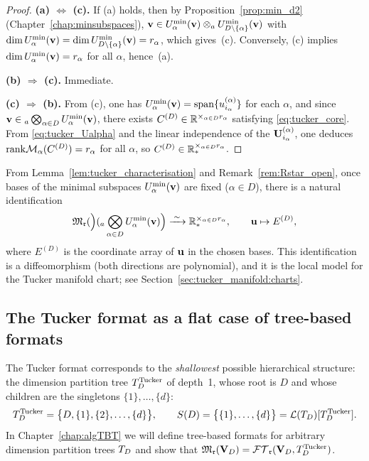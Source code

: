 \begin{proof}
\textbf{(a) $\Leftrightarrow$ (c).} If (a) holds, then by
Proposition~\ref{prop:min_d2} (Chapter~\ref{chap:minsubspaces}),
$\mathbf{v} \in U^{\min}_{\alpha}(\mathbf{v}) \otimes_a U^{\min}_{D\setminus\{\alpha\}}(\mathbf{v})$
with $\dim U^{\min}_{\alpha}(\mathbf{v}) = \dim U^{\min}_{D\setminus\{\alpha\}}(\mathbf{v}) = r_\alpha$,
which gives~(c). Conversely, (c) implies $\dim U^{\min}_{\alpha}(\mathbf{v}) = r_\alpha$
for all $\alpha$, hence~(a).

\textbf{(b) $\Rightarrow$ (c).} Immediate.

\textbf{(c) $\Rightarrow$ (b).} From (c), one has
$U^{\min}_{\alpha}(\mathbf{v}) = \mathrm{span}\{u^{(\alpha)}_{i_\alpha}\}$ for each $\alpha$,
and since $\mathbf{v} \in {}_a\bigotimes_{\alpha \in D} U^{\min}_{\alpha}(\mathbf{v})$,
there exists $C^{(D)} \in \mathbb{R}^{\times_{\alpha \in D} r_\alpha}$ satisfying
\eqref{eq:tucker_core}. From \eqref{eq:tucker_Ualpha} and the linear
independence of the $\mathbf{U}^{(\alpha)}_{i_\alpha}$, one deduces
$\mathrm{rank} \mathcal{M}_{\alpha}(C^{(D)}) = r_\alpha$ for all $\alpha$, so
$C^{(D)} \in \mathbb{R}^{\times_{\alpha \in D} r_\alpha}_*$.
\end{proof}

\begin{remark}
\label{rem:tucker_identification}
From Lemma~\ref{lem:tucker_characterisation} and
Remark~\ref{rem:Rstar_open}, once bases of the minimal subspaces
$U^{\min}_{\alpha}(\mathbf{v})$ are fixed ($\alpha \in D$), there is a natural
identification
\begin{equation}
\label{eq:tucker_iso}
    \mathfrak{M}_{\mathfrak{r}}(\Bigl)({}_a\bigotimes_{\alpha \in D} U^{\min}_{\alpha}(\mathbf{v})\Bigr)
    \xrightarrow{\;\sim\;}
    \mathbb{R}^{\times_{\alpha \in D} r_\alpha}_*,
    \qquad
    \mathbf{u} \mapsto E^{(D)},
\end{equation}
where $E^{(D)}$ is the coordinate array of $\mathbf{u}$ in the chosen bases.
This identification is a diffeomorphism (both directions are polynomial),
and it is the local model for the Tucker manifold chart; see
Section~\ref{sec:tucker_manifold:charts}.
\end{remark}

\subsection*{The Tucker format as a flat case of tree-based formats}

The Tucker format corresponds to the \emph{shallowest} possible
hierarchical structure: the dimension partition tree $T_D^{\mathrm{Tucker}}$ of
depth~1, whose root is $D$ and whose children are the singletons
$\{1\}, \ldots, \{d\}$:
\begin{equation*}
    T_D^{\mathrm{Tucker}} = \bigl\{D, \{1\}, \{2\}, \ldots, \{d\}\bigr\},
    \qquad
    S(D) = \bigl\{\{1\},\ldots,\{d\}\bigr\} = \mathcal{L}(T_D)[T_D^{\mathrm{Tucker}}].
\end{equation*}
In Chapter~\ref{chap:algTBT} we will define tree-based formats for
arbitrary dimension partition trees $T_D$ and show that
$\mathfrak{M}_{\mathfrak{r}}(\mathbf{V}_D) = \mathcal{FT}_{\mathfrak{r}}(\mathbf{V}_D,T_D^{\mathrm{Tucker}})$.

